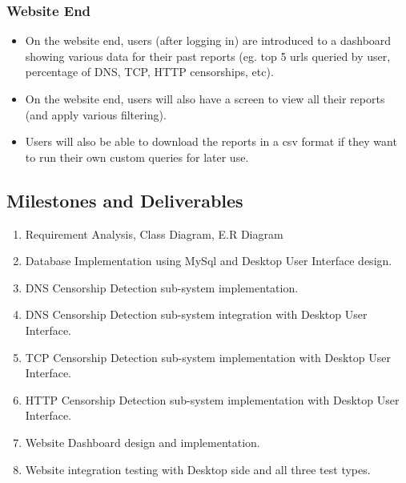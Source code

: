 \subsubsection{Website End}
	\begin{itemize}
		\item On the website end, users (after logging in) are introduced to a dashboard showing various data for their past reports (eg. top 5 urls queried by user, percentage of DNS, TCP, HTTP censorships, etc).
		\item On the website end, users will also have a screen to view all their reports (and apply various filtering).
		\item Users will also be able to download the reports in a csv format if they want to run their own custom queries for later use.
	\end{itemize}

	
\subsection{Milestones and Deliverables}
	
	\begin{enumerate}
	    \item Requirement Analysis, Class Diagram, E.R Diagram
	    \item Database Implementation using MySql and Desktop User Interface design.
	    \item DNS Censorship Detection sub-system implementation.
	    \item DNS Censorship Detection sub-system integration with Desktop User Interface.
	    \item TCP Censorship Detection sub-system implementation with Desktop User Interface.
	    \item HTTP Censorship Detection sub-system implementation with Desktop User Interface.
        \item Website Dashboard design and implementation.
        \item Website integration testing with Desktop side and all three test types.
	\end{enumerate}
	
	
	